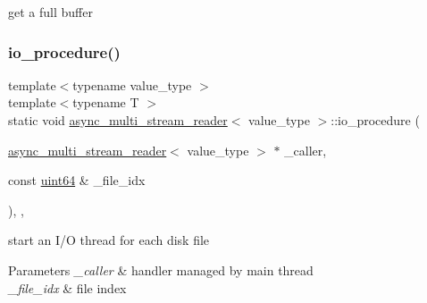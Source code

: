 get a full buffer 

\mbox{\label{classasync__multi__stream__reader_a6e68c1dfe4990e3320f6b03dbf400517}} 
\subsubsection{\texorpdfstring{io\+\_\+procedure()}{io\_procedure()}}
{\footnotesize\ttfamily template$<$typename value\+\_\+type $>$ \\
template$<$typename T $>$ \\
static void \hyperlink{classasync__multi__stream__reader}{async\+\_\+multi\+\_\+stream\+\_\+reader}$<$ value\+\_\+type $>$\+::io\+\_\+procedure (\begin{DoxyParamCaption}\item[{\hyperlink{classasync__multi__stream__reader}{async\+\_\+multi\+\_\+stream\+\_\+reader}$<$ value\+\_\+type $>$ $\ast$}]{\+\_\+caller,  }\item[{const \hyperlink{types_8h_a60e8696a4678cd348e991a1f172e53f7}{uint64} \&}]{\+\_\+file\+\_\+idx }\end{DoxyParamCaption})\hspace{0.3cm}{\ttfamily [inline]}, {\ttfamily [static]}, {\ttfamily [private]}}



start an I/O thread for each disk file 


\begin{DoxyParams}{Parameters}
{\em \+\_\+caller} & handler managed by main thread \\
\hline
{\em \+\_\+file\+\_\+idx} & file index \\
\hline
\end{DoxyParams}
\mbox{\label{classasync__multi__stream__reader_ae47f5af3e9c0964be88975391631b3d4}} 
